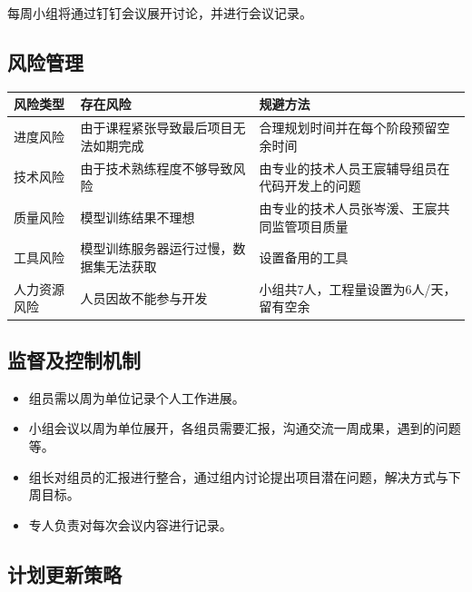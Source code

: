 \documentclass[hyperref, a4paper]{ctexart}
\providecommand{\tightlist}{%
  \setlength{\itemsep}{0pt}\setlength{\parskip}{0pt}}
\begin{document}
每周小组将通过钉钉会议展开讨论，并进行会议记录。

\hypertarget{ux98ceux9669ux7ba1ux7406}{%
\subsection{风险管理}\label{ux98ceux9669ux7ba1ux7406}}

\begin{table}[H]
\small 
\begin{center}  
\begin{tabular}{|p{1.5cm}|p{3cm}|p{5cm}|}  
\hline  
风险类型 & 存在风险 & 规避方法  \\ \hline  
进度风险 & 由于课程紧张导致最后项目无法如期完成 & 合理规划时间并在每个阶段预留空余时间 \\ \hline  
技术风险 & 由于技术熟练程度不够导致风险 & 由专业的技术人员王宸辅导组员在代码开发上的问题 \\  \hline  
质量风险 & 模型训练结果不理想 & 由专业的技术人员张岑湲、王宸共同监管项目质量 \\  \hline  
工具风险 & 模型训练服务器运行过慢，数据集无法获取 & 设置备用的工具 \\  \hline  
人力资源风险 & 人员因故不能参与开发 & 小组共7人，工程量设置为6人/天，留有空余 \\  \hline  
\end{tabular}  
\end{center}  
\end{table}

\hypertarget{ux76d1ux7763ux53caux63a7ux5236ux673aux5236}{%
\subsection{监督及控制机制}\label{ux76d1ux7763ux53caux63a7ux5236ux673aux5236}}

\begin{itemize}
\tightlist
\item
  组员需以周为单位记录个人工作进展。
\item
  小组会议以周为单位展开，各组员需要汇报，沟通交流一周成果，遇到的问题等。
\item
  组长对组员的汇报进行整合，通过组内讨论提出项目潜在问题，解决方式与下周目标。
\item
  专人负责对每次会议内容进行记录。
\end{itemize}

\hypertarget{ux8ba1ux5212ux66f4ux65b0ux7b56ux7565}{%
\subsection{计划更新策略}\label{ux8ba1ux5212ux66f4ux65b0ux7b56ux7565}}
\end{document}
